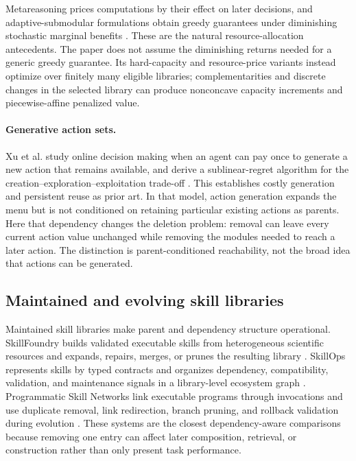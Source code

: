 Metareasoning prices computations by their effect on later decisions, and
adaptive-submodular formulations obtain greedy guarantees under diminishing
stochastic marginal benefits
\cite{RussellWefald1991,HayEtAl2012,GolovinKrause2011}.  These are the natural
resource-allocation antecedents.  The paper does not assume the diminishing
returns needed for a generic greedy guarantee.  Its hard-capacity and
resource-price variants instead optimize over finitely many eligible
libraries; complementarities and discrete changes in the selected library
can produce nonconcave capacity increments and piecewise-affine penalized
value.

\paragraph{Generative action sets.}
Xu et al. study online decision making when an agent can pay once to generate
a new action that remains available, and derive a sublinear-regret algorithm
for the creation--exploration--exploitation trade-off
\cite{XuEtAl2026GenerativeActions}.  This establishes costly generation and
persistent reuse as prior art.  In that model, action generation expands the
menu but is not conditioned on retaining particular existing actions as
parents.  Here that dependency changes the deletion problem: removal can
leave every current action value unchanged while removing the modules needed
to reach a later action.  The distinction is parent-conditioned reachability,
not the broad idea that actions can be generated.

\subsection{Maintained and evolving skill libraries}

Maintained skill libraries make parent and dependency structure operational.
SkillFoundry builds validated executable skills from heterogeneous scientific
resources and expands, repairs, merges, or prunes the resulting library
\cite{ShenEtAl2026SkillFoundry}.  SkillOps represents skills by typed contracts
and organizes dependency, compatibility, validation, and maintenance signals
in a library-level ecosystem graph \cite{PuSongZhao2026SkillOps}.
Programmatic Skill Networks link executable programs through invocations and
use duplicate removal, link redirection, branch pruning, and rollback
validation during evolution \cite{ShiYuanLiu2026PSN}.  These systems are the
closest dependency-aware comparisons because removing one entry can affect
later composition, retrieval, or construction rather than only present task
performance.

